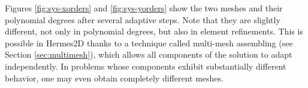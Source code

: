 Figures \ref{fig:sys-xorders} and \ref{fig:sys-yorders} show the two meshes and their polynomial
degrees after several adaptive steps. Note that they are slightly different, not only in 
polynomial degrees, but also in element refinements. This is possible in Hermes2D thanks to 
a technique called multi-mesh assembling (see Section \ref{sec:multimesh}), which allows 
all components of the solution to adapt independently. In problems whose components exhibit
substantially different behavior, one may even obtain completely different meshes.

\clearpage







\newpage
